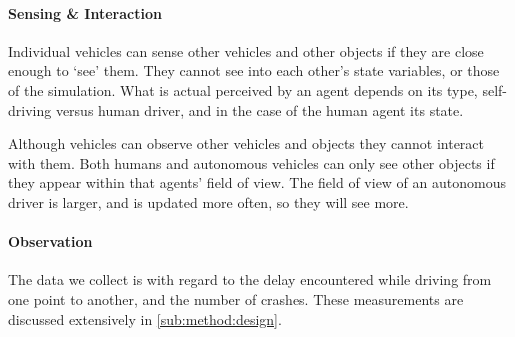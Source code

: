
\paragraph{Sensing \& Interaction} 
Individual vehicles can sense other vehicles and other objects if they are close enough to `see' them. They cannot see into each other's state variables, or those of the simulation. What is actual perceived by an agent depends on its type, self-driving versus human driver, and in the case of the human agent its state. 

Although vehicles can observe other vehicles and objects they cannot interact with them. Both humans and autonomous vehicles can only see other objects if they appear within that agents' field of view. The field of view of an autonomous driver is larger, and is updated more often, so they will see more.




\paragraph{Observation} 
The data we collect is with regard to the delay encountered while driving from one point to another, and the number of crashes. These measurements are discussed extensively in \cref{sub:method:design}.


